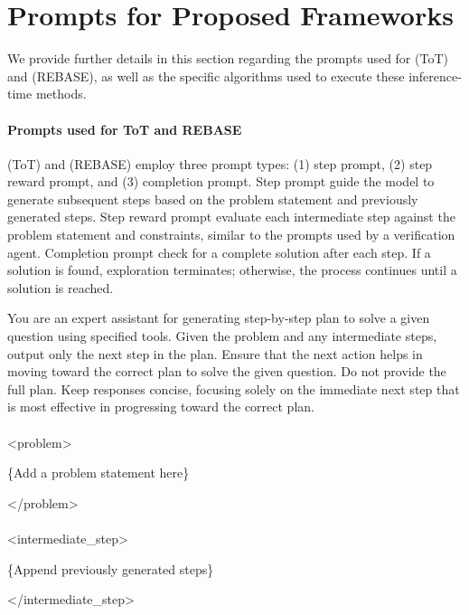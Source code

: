 \section{Prompts for Proposed Frameworks}
\label{app:frameworks}

We provide further details in this section regarding the prompts used for \plangen{} (ToT) and \plangen{} (REBASE), as well as the specific algorithms used to execute these inference-time methods.



\paragraph{Prompts used for ToT and REBASE}

\plangen{} (ToT) and \plangen{} (REBASE) employ three prompt types: (1) step prompt, (2) step reward prompt, and (3) completion prompt. Step prompt guide the model to generate subsequent steps based on the problem statement and previously generated steps. Step reward prompt evaluate each intermediate step against the problem statement and constraints, similar to the prompts used by a verification agent. Completion prompt check for a complete solution after each step. If a solution is found, exploration terminates; otherwise, the process continues until a solution is reached.

\begin{tcolorbox}[boxrule=0pt, frame hidden, title=Step Prompt, breakable, sharp corners, borderline west={0pt}{0pt}{black!50}, title style={
        colback=black!50, %
        colframe=black!50, %
        coltitle=black %
    }]

You are an expert assistant for generating step-by-step plan to solve a given question using specified tools. Given the problem and any intermediate steps, output only the next step in the plan. Ensure that the next action helps in moving toward the correct plan to solve the given question. Do not provide the full plan. Keep responses concise, focusing solely on the immediate next step that is most effective in progressing toward the correct plan.
\\
\\
<problem>

\{Add a problem statement here\}

</problem>
\\
\\
<intermediate\_step>

\{Append previously generated steps\}

</intermediate\_step>
\end{tcolorbox}

